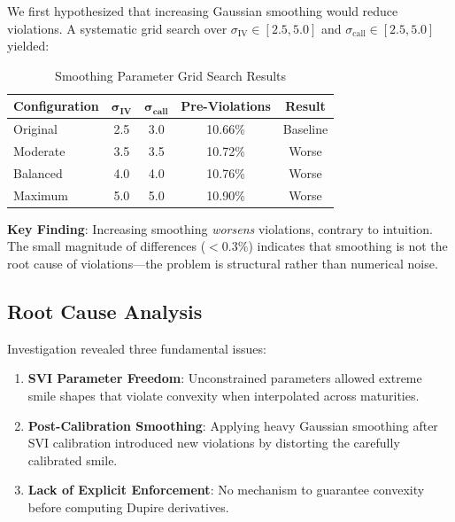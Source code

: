 \documentclass[12pt,a4paper]{article}
\begin{document}
We first hypothesized that increasing Gaussian smoothing would reduce violations. A systematic grid search over $\sigma_{\text{IV}} \in [2.5, 5.0]$ and $\sigma_{\text{call}} \in [2.5, 5.0]$ yielded:

\begin{table}[h]
\centering
\caption{Smoothing Parameter Grid Search Results\footnotemark}
\begin{tabular}{lcccc}
\toprule
\textbf{Configuration} & $\boldsymbol{\sigma_{\text{IV}}}$ & $\boldsymbol{\sigma_{\text{call}}}$ & \textbf{Pre-Violations} & \textbf{Result} \\
\midrule
Original & 2.5 & 3.0 & 10.66\% & Baseline \\
Moderate & 3.5 & 3.5 & 10.72\% & Worse \\
Balanced & 4.0 & 4.0 & 10.76\% & Worse \\
Maximum & 5.0 & 5.0 & 10.90\% & Worse \\
\bottomrule
\end{tabular}
\end{table}

\textbf{Key Finding}: Increasing smoothing \emph{worsens} violations, contrary to intuition. The small magnitude of differences ($<0.3\%$) indicates that smoothing is not the root cause of violations---the problem is structural rather than numerical noise.

\subsection{Root Cause Analysis}

Investigation revealed three fundamental issues:

\begin{enumerate}
    \item \textbf{SVI Parameter Freedom}: Unconstrained parameters allowed extreme smile shapes that violate convexity when interpolated across maturities.
    
    \item \textbf{Post-Calibration Smoothing}: Applying heavy Gaussian smoothing after SVI calibration introduced new violations by distorting the carefully calibrated smile.
    
    \item \textbf{Lack of Explicit Enforcement}: No mechanism to guarantee convexity before computing Dupire derivatives.
\end{enumerate}
\end{document}
